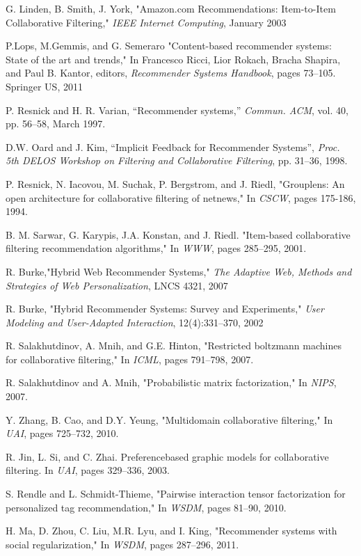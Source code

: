 \documentclass[oneside,13pt]{extreport}
\begin{document}
\begin{thebibliography}{10}
G. Linden, B. Smith, J. York, "Amazon.com Recommendations: Item-to-Item
Collaborative Filtering," \emph{IEEE Internet Computing}, January 2003

P.Lops, M.Gemmis, and G. Semeraro "Content-based recommender systems: State of the art and
trends," In Francesco Ricci, Lior Rokach, Bracha Shapira, and
Paul B. Kantor, editors, \emph{Recommender Systems Handbook},
pages 73–105. Springer US, 2011

P. Resnick and H. R. Varian, “Recommender systems,” \emph{Commun. ACM}, vol. 40, pp. 56–58, March 1997.

D.W. Oard and J. Kim, “Implicit Feedback for Recommender Systems”, \emph{Proc. 5th DELOS Workshop on Filtering and Collaborative Filtering}, pp. 31–36, 1998.

P. Resnick, N. Iacovou, M. Suchak, P. Bergstrom, and J. Riedl, "Grouplens: An open architecture for collaborative filtering of netnews," In \emph{CSCW}, pages 175-186, 1994.

B. M. Sarwar, G. Karypis, J.A. Konstan, and J. Riedl. "Item-based collaborative filtering recommendation
algorithms," In \emph{WWW}, pages 285–295, 2001.

R. Burke,"Hybrid Web Recommender Systems," \emph{The Adaptive Web,
Methods and Strategies of Web Personalization}, LNCS 4321, 2007

R. Burke, "Hybrid Recommender Systems: Survey and Experiments," \emph{User Modeling and User-Adapted Interaction}, 12(4):331–370, 2002

R. Salakhutdinov, A. Mnih, and G.E. Hinton, "Restricted boltzmann machines for collaborative
filtering," In \emph{ICML}, pages 791–798, 2007.

R. Salakhutdinov and A. Mnih, "Probabilistic matrix factorization," In \emph{NIPS}, 2007.

Y. Zhang, B. Cao, and D.Y. Yeung, "Multidomain collaborative filtering," In \emph{UAI}, pages 725–732,
2010.

R. Jin, L. Si, and C. Zhai. Preferencebased graphic models for collaborative filtering. In
\emph{UAI}, pages 329–336, 2003.

S. Rendle and L. Schmidt-Thieme, "Pairwise interaction tensor factorization for personalized tag
recommendation," In \emph{WSDM}, pages 81–90, 2010.

H. Ma, D. Zhou, C. Liu, M.R. Lyu, and I. King, "Recommender systems with social
regularization," In \emph{WSDM}, pages 287–296, 2011.

\end{thebibliography}



\printindex
\end{document}
